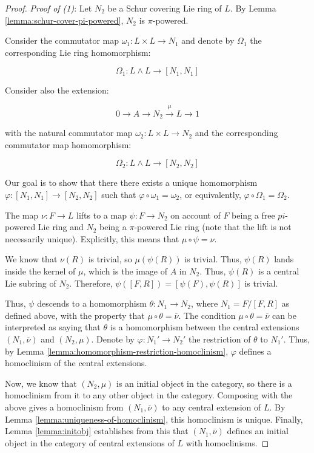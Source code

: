 \documentclass{ucetd}
\begin{document}
\begin{proof}
  {\em Proof of (1)}: Let $N_2$ be a Schur covering Lie ring of $L$. By
  Lemma \ref{lemma:schur-cover-pi-powered}, $N_2$ is $\pi$-powered.

  Consider the commutator map $\omega_1:L \times L \to N_1$ and denote
  by $\Omega_1$ the corresponding Lie ring homomorphism:

  $$\Omega_1: L \wedge L \to [N_1,N_1]$$

  Consider also the extension:

  $$0 \to A \to N_2 \stackrel{\mu}{\to} L \to 1$$
  
  with the natural commutator map $\omega_2:L \times L \to N_2$ and the
  corresponding commutator map homomorphism:

  $$\Omega_2:L \wedge L \to [N_2,N_2]$$
  
  Our goal is to show that there there exists a unique homomorphism
  $\varphi:[N_1,N_1] \to [N_2,N_2]$ such that $\varphi \circ
  \omega_1 = \omega_2$, or equivalently, $\varphi \circ \Omega_1 =
  \Omega_2$.

  The map $\nu:F \to L$ lifts to a map $\psi:F \to N_2$ on account of
  $F$ being a free $pi$-powered Lie ring and $N_2$ being a $\pi$-powered
  Lie ring (note that the lift is not necessarily unique). Explicitly,
  this means that $\mu \circ \psi = \nu$.

  We know that $\nu(R)$ is trivial, so $\mu(\psi(R))$ is trivial. Thus,
  $\psi(R)$ lands inside the kernel of $\mu$, which is the image of $A$
  in $N_2$. Thus, $\psi(R)$ is a central Lie subring of $N_2$. Therefore,
  $\psi([F,R]) = [\psi(F),\psi(R)]$ is trivial.
  
  Thus, $\psi$ descends to a homomorphism $\theta:N_1 \to N_2$, where
  $N_1 = F/[F,R]$ as defined above, with the property that $\mu \circ
  \theta = \overline{\nu}$. The condition $\mu \circ \theta =
  \overline{\nu}$ can be interpreted as saying that $\theta$ is a
  homomorphism between the central extensions $(N_1,\overline{\nu})$ and
  $(N_2,\mu)$. Denote by $\varphi:N_1' \to N_2'$ the restriction of
  $\theta$ to $N_1'$. Thus, by Lemma
  \ref{lemma:homomorphism-restriction-homoclinism}, $\varphi$ defines a
  homoclinism of the central extensions. 

  Now, we know that $(N_2,\mu)$ is an initial object in the category,
  so there is a homoclinism from it to any other object in the
  category. Composing with the above gives a homoclinism from
  $(N_1,\overline{\nu})$ to any central extension of $L$. By Lemma
  \ref{lemma:uniqueness-of-homoclinism}, this homoclinism is
  unique. Finally, Lemma \ref{lemma:initobj} establishes from this that
  $(N_1,\overline{\nu})$ defines an initial object in the category of central
  extensions of $L$ with homoclinisms.


\end{proof}
\end{document}
